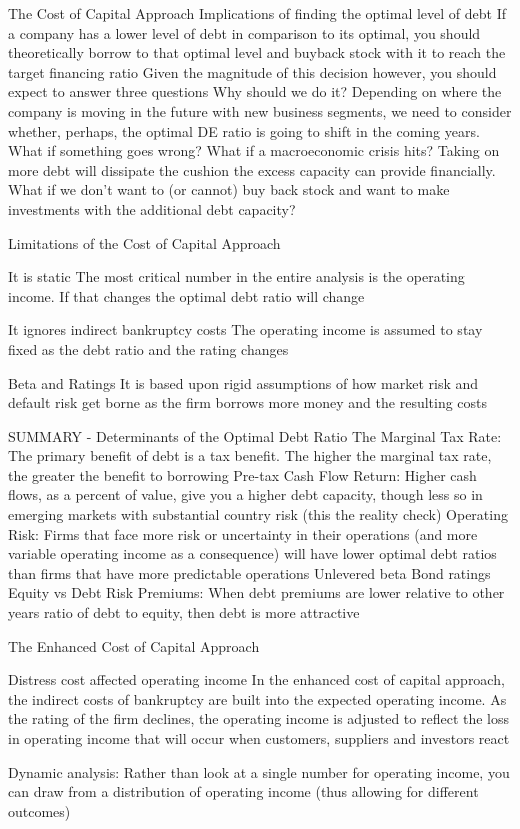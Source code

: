 \documentclass[10pt]{article}
\begin{document}
\begin{core}{The Cost of Capital Approach}
      Implications of finding the optimal level of debt
      If a company has a lower level of debt in comparison to its optimal, you should theoretically borrow to that optimal level and buyback stock with it to reach the target financing ratio
      Given the magnitude of this decision however, you should expect to answer three questions
      Why should we do it? Depending on where the company is moving in the future with new business segments, we need to consider whether, perhaps, the optimal DE ratio is going to shift in the coming years.
      What if something goes wrong? What if a macroeconomic crisis hits? Taking on more debt will dissipate the cushion the excess capacity can provide financially.
      What if we don’t want to (or cannot) buy back stock and want to make investments with the additional debt capacity?
      
      Limitations of the Cost of Capital Approach

      It is static
      The most critical number in the entire analysis is the operating income. If that changes the optimal debt ratio will change

      It ignores indirect bankruptcy costs
      The operating income is assumed to stay fixed as the debt ratio and the rating changes

      Beta and Ratings
      It is based upon rigid assumptions of how market risk and default risk get borne as the firm borrows more money and the resulting costs

      SUMMARY - Determinants of the Optimal Debt Ratio
      The Marginal Tax Rate: The primary benefit of debt is a tax benefit. The higher the marginal tax rate, the greater the benefit to borrowing
      Pre-tax Cash Flow Return: Higher cash flows, as a percent of value, give you a higher debt capacity, though less so in emerging markets with substantial country risk (this the reality check)
      Operating Risk: Firms that face more risk or uncertainty in their operations (and more variable operating income as a consequence) will have lower optimal debt ratios than firms that have more predictable operations
      Unlevered beta
      Bond ratings
      Equity vs Debt Risk Premiums: When debt premiums are lower relative to other years ratio of debt to equity, then debt is more attractive

    \end{core}

    \begin{core}{The Enhanced Cost of Capital Approach}

      Distress cost affected operating income
      In the enhanced cost of capital approach, the indirect costs of bankruptcy are built into the expected operating income. As the rating of the firm declines, the operating income is adjusted to reflect the loss in operating income that will occur when customers, suppliers and investors react

      Dynamic analysis: Rather than look at a single number for operating income, you can draw from a distribution of operating income (thus allowing for different outcomes)

    \end{core}
\end{document}
